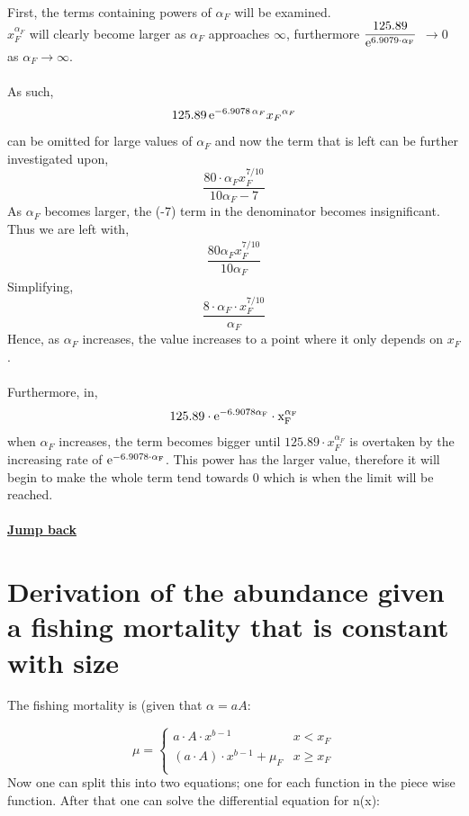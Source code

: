 \documentclass{article}
\numberwithin{equation}{section} %
\begin{document}
First, the terms containing powers of $\alpha_{F}$ will be examined.\\ 
$x_{F}^{\alpha_{F}}$ will clearly become larger as $\alpha_{F}$ approaches $\infty$, furthermore $\dfrac{125.89}{\rm{e}^{6.9079\cdot\alpha_{F}}}$  $\rightarrow 0$  as  $\alpha_{F} \rightarrow \infty$. \\\\
As such, 
\begin{align*}
    125.89\,{{\rm e}^{- 6.9078\,\alpha_{F}}}{x_{F}}^{\alpha_{F}}
\end{align*}
can be omitted for large values of $\alpha_{F}$ and now the term that is left can be further investigated upon,
\begin{equation}
    \dfrac{80\cdot\alpha_{F}x_{F}^{7/10}}{10\alpha_{F}-7}
\end{equation}
As $\alpha_{F}$ becomes larger, the (-7) term in the denominator becomes insignificant. Thus we are left with,
\begin{align*}
    \dfrac{80\alpha_{F}x_{F}^{7/10}}{10\alpha_{F}}
\end{align*}
Simplifying,
\begin{equation}
    \dfrac{8\cdot\alpha_{F}\cdot x_{F}^{7/10}}{\alpha_{F}}
\end{equation}
Hence, as $\alpha_{F}$ increases, the value increases to a point where it only depends on $x_{F}$.\\\\
Furthermore, in,
\begin{equation}
    125.89\cdot\rm{e}^{-6.9078\alpha_{F}}\cdot x_{F}^{\alpha_{F}}
\end{equation}
when $\alpha_{F}$ increases, the term becomes bigger until $125.89\cdot x_{F}^{\alpha_{F}}$ is overtaken by the increasing rate of $ \rm{e}^{-6.9078\cdot\alpha_{F}}$. This power has the larger value, therefore it will begin to make the whole term tend towards 0 which is when the limit will be reached. \\
\\
\textbf{\hyperref[jmp:a:fishingStrategy]{Jump back }}

\newpage
\section{Derivation of the abundance given a fishing mortality that is constant with size}\label{a:3extra1nx}
The fishing mortality is (given that $\alpha=aA$:

\begin{equation}
    \mu =
       \left\{
        \begin{array}{ll}
              a\cdot A\cdot x^{b-1} & x < x_F \\
              (a\cdot A)\cdot x^{b-1}+\mu_{F} & x\geq x_F \\
        \end{array} 
        \right.
\end{equation}
Now one can split this into two equations; one for each function in the piece wise function. After that one can solve the differential equation for n(x):
 
\end{document}
